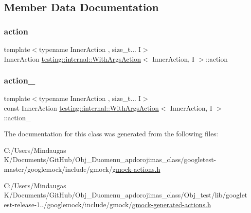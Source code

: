 \subsection{Member Data Documentation}
\mbox{\label{structtesting_1_1internal_1_1_with_args_action_af1676990dc34762bb0eab2ff6047cf52}} 
\subsubsection{\texorpdfstring{action}{action}}
{\footnotesize\ttfamily template$<$typename Inner\+Action , size\+\_\+t... I$>$ \\
Inner\+Action \mbox{\hyperlink{structtesting_1_1internal_1_1_with_args_action}{testing\+::internal\+::\+With\+Args\+Action}}$<$ Inner\+Action, I $>$\+::action}

\mbox{\label{structtesting_1_1internal_1_1_with_args_action_ae106c813aa3c4b2fb3398933d07c9cce}} 
\subsubsection{\texorpdfstring{action\_}{action\_}}
{\footnotesize\ttfamily template$<$typename Inner\+Action , size\+\_\+t... I$>$ \\
const Inner\+Action \mbox{\hyperlink{structtesting_1_1internal_1_1_with_args_action}{testing\+::internal\+::\+With\+Args\+Action}}$<$ Inner\+Action, I $>$\+::action\+\_\+\hspace{0.3cm}{\ttfamily [private]}}



The documentation for this class was generated from the following files\+:\begin{DoxyCompactItemize}
\item 
C\+:/\+Users/\+Mindaugas K/\+Documents/\+Git\+Hub/\+Obj\+\_\+\+Duomenu\+\_\+apdorojimas\+\_\+class/googletest-\/master/googlemock/include/gmock/\mbox{\hyperlink{googletest-master_2googlemock_2include_2gmock_2gmock-actions_8h}{gmock-\/actions.\+h}}\item 
C\+:/\+Users/\+Mindaugas K/\+Documents/\+Git\+Hub/\+Obj\+\_\+\+Duomenu\+\_\+apdorojimas\+\_\+class/\+Obj\+\_\+test/lib/googletest-\/release-\/1../googlemock/include/gmock/\mbox{\hyperlink{_obj__test_2lib_2googletest-release-1_88_81_2googlemock_2include_2gmock_2gmock-generated-actions_8h}{gmock-\/generated-\/actions.\+h}}\end{DoxyCompactItemize}
